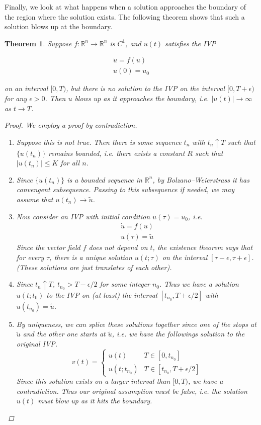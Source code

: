 \documentclass{article}
\newtheorem{theorem}{Theorem}[section]
\def\R{{\mathbb R}}
\begin{document}
Finally, we look at what happens when a solution approaches the boundary of the region where the solution exists. The following theorem shows that such a solution blows up at the boundary.


\begin{theorem}
Suppose $f: \R^n \rightarrow \R^n$ is $C^1$, and $u(t)$ satisfies the IVP

\begin{align*}
\dot{u} = f(u) \\
u(0) = u_0 
\end{align*}

on an interval $[0, T)$, but there is no solution to the IVP on the interval $[0, T + \epsilon)$ for any $\epsilon > 0$. Then $u$ blows up as it approaches the boundary, i.e. $|u(t)| \rightarrow \infty$ as $t \rightarrow T$.

\begin{proof}
We employ a proof by contradiction.
\begin{enumerate}
\item Suppose this is not true. Then there is some sequence $t_n$ with $t_n \uparrow T$ such that $\{ u(t_n) \}$ remains bounded, i.e. there exists a constant $R$ such that $|u(t_n)| \leq K$ for all $n$.
\item Since $\{ u(t_n) \}$ is a bounded sequence in $\R^n$, by Bolzano–Weierstrass it has convengent subsequence. Passing to this subsequence if needed, we may assume that $u(t_n) \rightarrow \tilde{u}$.
\item Now consider an IVP with initial condition $u(\tau) = u_0$, i.e.
\begin{align*}
\dot{u} = f(u) \\
u(\tau) = \tilde{u}
\end{align*}
Since the vector field $f$ does not depend on $t$, the existence theorem says that for every $\tau$, there is a unique solution $u(t; \tau)$ on the interval $[\tau - \epsilon, \tau + \epsilon]$. (These solutions are just translates of each other).
\item Since $t_n \uparrow T$, $t_{n_0} > T - \epsilon/2$ for some integer $n_0$. Thus we have a solution $u(t; t_0)$ to the IVP on (at least) the interval $[t_{n_0}, T + \epsilon/2]$ with $u(t_{n_0}) = \tilde{u}$.
\item By uniqueness, we can splice these solutions together since one of the stops at $\tilde{u}$ and the other one starts at $\tilde{u}$, i.e. we have the followings solution to the original IVP.
\[
v(t) = \begin{cases}
u(t) & T \in [0, t_{n_0}] \\
u(t; t_{n_0}) & T \in [t_{n_0}, T + \epsilon/2]
\end{cases}
\]
Since this solution exists on a larger interval than $[0, T)$, we have a contradiction. Thus our original assumption must be false, i.e. the solution $u(t)$ must blow up as it hits the boundary.

\end{enumerate}
\end{proof}

\end{theorem}
\end{document}
